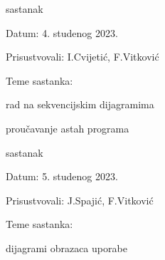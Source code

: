 \begin{packed_enum}
			\item  sastanak
			\item[] \begin{packed_item}
				\item Datum: 4. studenog 2023.
				\item Prisustvovali: I.Cvijetić, F.Vitković
				\item Teme sastanka:
				\begin{packed_item}
					\item  rad na sekvencijskim dijagramima
					\item  proučavanje astah programa
				\end{packed_item}
			\end{packed_item}
			
			\item  sastanak
			\item[] \begin{packed_item}
				\item Datum: 5. studenog 2023.
				\item Prisustvovali: J.Spajić, F.Vitković
				\item Teme sastanka:
				\begin{packed_item}
					\item  dijagrami obrazaca uporabe
				\end{packed_item}
			\end{packed_item}
			

\end{packed_enum}
